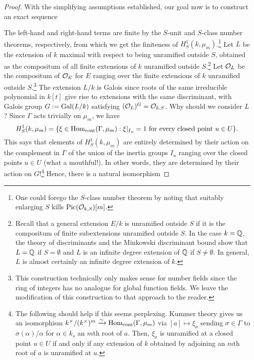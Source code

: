 \documentclass[11pt]{article}
\begin{document}
\begin{proof}
With the simplifying assumptions established, our goal now is to construct an exact sequence
\begin{center}
\end{center}
The left-hand and right-hand terms are finite by the $S$-unit and $S$-class number theorems, respectively, from which we get the finiteness of $H_S^1(k,\mu_m)$.\footnote{One could forego the $S$-class number theorem by noting that suitably enlarging $S$ kills $\operatorname{Pic}(\mathcal{O}_{k,S})[m]$.} Let $L$ be the extension of $k$ maximal with respect to being unramified outside $S$, obtained as the compositum of all finite extensions of $k$ unramified outside $S$.\footnote{Recall that a general extension $E/k$ is unramified outside $S$ if it is the compositum of finite subextensions unramified outside $S$. In the case $k=\mathbb{Q}$, the theory of discriminants and the Minkowski discriminant bound show that $L=\mathbb{Q}$ if $S=\emptyset$ and $L$ is an infinite degree extension of $\mathbb{Q}$ if $S\neq\emptyset$. In general, $L$ is almost certainly an infinite degree extension of $k$.} Let $\mathcal{O}_L$ be the compositum of $\mathcal{O}_E$ for $E$ ranging over the finite extensions of $k$ unramified outside $S$.\footnote{This construction technically only makes sense for number fields since the ring of integers has no analogue for global function fields. We leave the modification of this construction to that approach to the reader.} The extension $L/k$ is Galois since roots of the same irreducible polynomial in $k[t]$ give rise to extensions with the same discriminant, with Galois group $G:=\operatorname{Gal}(L/k)$ satisfying $(\mathcal{O}_L)^G=\mathcal{O}_{k,S}$. Why should we consider $L$? Since $\Gamma$ acts trivially on $\mu_m$, we have
$$H_S^1(k,\mu_m)=\{\xi\in\operatorname{Hom}_{\operatorname{cont}}(\Gamma,\mu_m) : \xi|_{I_u}=1\textrm{ for every closed point }u\in U\}.$$
This says that elements of $H_S^1(k,\mu_m)$ are entirely determined by their action on the complement in $\Gamma$ of the union of the inertia groups $I_u$ ranging over the closed points $u\in U$ (what a mouthful!). In other words, they are determined by their action on $G$!\footnote{The following should help if this seems perplexing. Kummer theory gives us an isomorphism $k^{\times}/(k^{\times})^m\xrightarrow{\sim}\operatorname{Hom}_{\operatorname{cont}}(\Gamma,\mu_m)$ via $[a]\mapsto\xi_a$ sending $\sigma\in\Gamma$ to $\sigma(\alpha)/\alpha$ for $\alpha\in k_s$ an $m$th root of $a$. Then, $\xi_a$ is unramified at a closed point $u\in U$ if and only if any extension of $k$ obtained by adjoining an $m$th root of $a$ is unramified at $u$.} Hence, there is a natural isomorphism

\end{proof}
\end{document}
